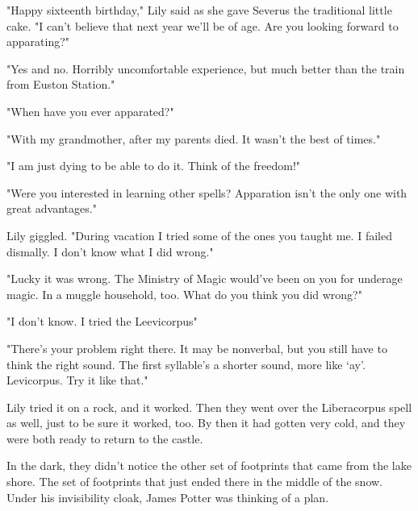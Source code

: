 "Happy sixteenth birthday," Lily said as she gave Severus the traditional little cake. "I can't believe that next year we'll be of age. Are you looking forward to apparating?"

"Yes and no. Horribly uncomfortable experience, but much better than the train from Euston Station."

"When have you ever apparated?"

"With my grandmother, after my parents died. It wasn't the best of times."

"I am just dying to be able to do it. Think of the freedom!"

"Were you interested in learning other spells? Apparation isn't the only one with great advantages."

Lily giggled. "During vacation I tried some of the ones you taught me. I failed dismally. I don't know what I did wrong."

"Lucky it was wrong. The Ministry of Magic would've been on you for underage magic. In a muggle household, too. What do you think you did wrong?"

"I don't know. I tried the Leevicorpus{\el}"

"There's your problem right there. It may be nonverbal, but you still have to think the right sound. The first syllable's a shorter sound, more like `ay'. Levicorpus. Try it like that."

Lily tried it on a rock, and it worked. Then they went over the Liberacorpus spell as well, just to be sure it worked, too. By then it had gotten very cold, and they were both ready to return to the castle.

In the dark, they didn't notice the other set of footprints that came from the lake shore. The set of footprints that just ended there in the middle of the snow. Under his invisibility cloak, James Potter was thinking of a plan. 


